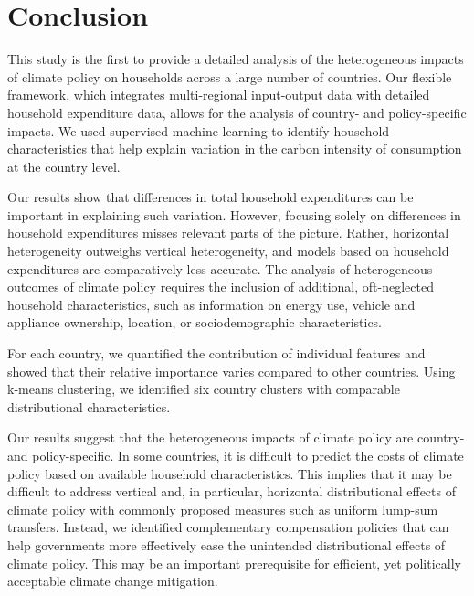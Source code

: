 \documentclass[12pt, a4paper]{article}
\begin{document}
\section{Conclusion} \label{sec:conclusion}

This study is the first to provide a detailed analysis of the heterogeneous impacts of climate policy on households across a large number of countries. Our flexible framework, which integrates multi-regional input-output data with detailed household expenditure data, allows for the analysis of country- and policy-specific impacts. We used supervised machine learning to identify household characteristics that help explain variation in the carbon intensity of consumption at the country level.

Our results show that differences in total household expenditures can be important in explaining such variation. However, focusing solely on differences in household expenditures misses relevant parts of the picture. Rather, horizontal heterogeneity outweighs vertical heterogeneity, and models based on household expenditures are comparatively less accurate. The analysis of heterogeneous outcomes of climate policy requires the inclusion of additional, oft-neglected household characteristics, such as information on energy use, vehicle and appliance ownership, location, or sociodemographic characteristics.

For each country, we quantified the contribution of individual features and showed that their relative importance varies compared to other countries. Using k-means clustering, we identified six country clusters with comparable distributional characteristics.

Our results suggest that the heterogeneous impacts of climate policy are country- and policy-specific. In some countries, it is difficult to predict the costs of climate policy based on available household characteristics. This implies that it may be difficult to address vertical and, in particular, horizontal distributional effects of climate policy with commonly proposed measures such as uniform lump-sum transfers. Instead, we identified complementary compensation policies that can help governments more effectively ease the unintended distributional effects of climate policy. This may be an important prerequisite for efficient, yet politically acceptable climate change mitigation. 
\end{document}
